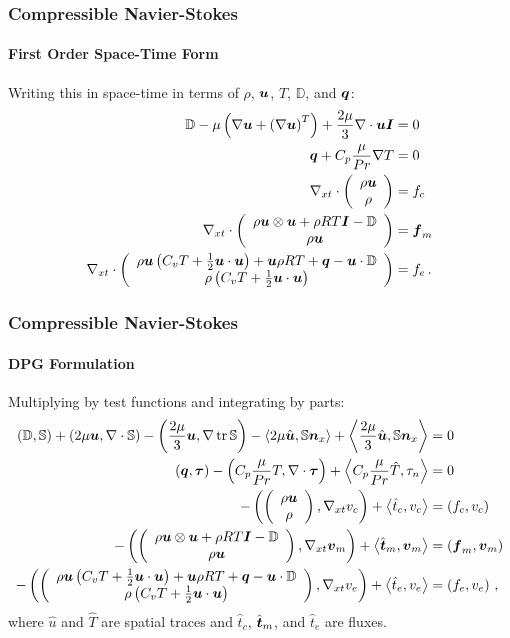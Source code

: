 \documentclass[18pt,xcolor=table]{beamer}
\begin{document}
\begin{frame}[t]
\frametitle{Compressible Navier-Stokes}
\framesubtitle{First Order Space-Time Form}  %
Writing this in space-time in terms of $\rho$, $\bfu$, $T$, $\mathbb{D}$, and $\bfq$:
\begin{align*}
  \mathbb{D}-\mu\LRp{\Grad\bfu+\LRp{\Grad\bfu}^T}+\frac{2\mu}{3}\Div\bfu\bfI&=0\\
  \bfq+C_p\frac{\mu}{Pr}\Grad T&=0\\
  \Divxt\vecttwo{\rho\bfu}{\rho}&=f_c\\
  \Divxt\vecttwo{\rho\bfu\otimes\bfu+\rho RT\bfI-\mathbb{D}}{\rho\bfu}&=\bff_m\\
  \Divxt\vecttwo{\rho\bfu\LRp{C_v T+\frac{1}{2}\bfu\cdot\bfu}+\bfu\rho RT+\bfq-\bfu\cdot\mathbb{D}}{\rho\LRp{C_v T+\frac{1}{2}\bfu\cdot\bfu}}&=f_e\,.
\end{align*}
\end{frame}

\begin{frame}[t]
\frametitle{Compressible Navier-Stokes}
\framesubtitle{DPG Formulation}  %
Multiplying by test functions and integrating by parts:
{
\small
\begin{align*}
  \LRp{\mathbb{D},\mathbb{S}}+\LRp{2\mu\bfu,\Div\mathbb{S}}-\LRp{\frac{2\mu}{3}\bfu,\Grad\trace{\mathbb{S}}}
  -\LRa{2\mu\hat\bfu,\mathbb{S}\bfn_x}+\LRa{\frac{2\mu}{3}\hat\bfu,\mathbb{S}\bfn_x}&=0\\
  \LRp{\bfq,\bftau}-\LRp{C_p\frac{\mu}{Pr}T,\Div\bftau}+\LRa{C_p\frac{\mu}{Pr}\hat T,\tau_n}&=0\\
  -\LRp{\vecttwo{\rho\bfu}{\rho},\Gradxt v_c}+\LRa{\hat t_c,v_c}&=\LRp{f_c,v_c}\\
  -\LRp{\vecttwo{\rho\bfu\otimes\bfu+\rho RT\bfI-\mathbb{D}}{\rho\bfu},\Gradxt\bfv_m}+\LRa{\hat\bft_m,\bfv_m}&=\LRp{\bff_m,\bfv_m}\\
  -\LRp{\vecttwo{\rho\bfu\LRp{C_v T+\frac{1}{2}\bfu\cdot\bfu}+\bfu\rho RT+\bfq-\bfu\cdot\mathbb{D}}{\rho\LRp{C_v T+\frac{1}{2}\bfu\cdot\bfu}},\Gradxt v_e}
  +\LRa{\hat t_e,v_e}&=\LRp{f_e,v_e}\,,
\end{align*}
}
where $\hat u$ and $\hat T$ are spatial traces and $\hat t_c$, $\hat\bft_m$, and $\hat t_e$ are fluxes.
\end{frame}

\end{document}
